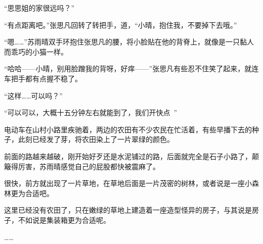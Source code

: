 “思思姐的家很远吗？”

“有点距离吧。”张思凡回转了转把手，道，“小晴，抱住我，不要掉下去哦。”

“嗯……”苏雨晴双手环抱住张思凡的腰，将小脸贴在他的背脊上，就像是一只黏人而乖巧的小猫一样。

“哈哈——小晴，别用脸蹭我的背呀，好痒——”张思凡有些忍不住笑了起来，就连车把手都有点握不稳了。

“这样……可以吗？”

“可以可以，大概十五分钟左右就能到了，我们开快点~”

电动车在山村小路里疾驰着，两边的农田有不少农民在忙活着，有些早播下去的种子，此刻已经发了芽，将农田染上了一片翠绿的颜色。

前面的路越来越破，刚开始好歹还是水泥铺过的路，后面就完全是石子小路了，颠簸得厉害，苏雨晴感觉自己的屁股都快被震麻了。

很快，前方就出现了一片草地，在草地后面是一片茂密的树林，或者说是一座小森林更为合适吧。

这里已经没有农田了，只在嫩绿的草地上建造着一座造型怪异的房子，与其说是房子，不如说是集装箱更为合适呢。

……
